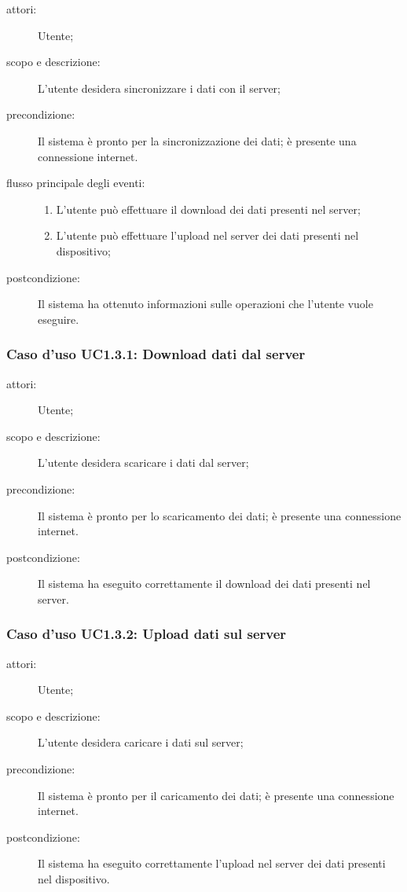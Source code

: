 \begin{description}
\item[attori:] Utente;
\item[scopo e descrizione:] L'utente desidera sincronizzare i dati con il server;
\item[precondizione:] Il sistema è pronto per la sincronizzazione dei dati; è presente una connessione internet.
\item[flusso principale degli eventi:] \hfill 
	\begin{enumerate}
	\item L'utente può effettuare il download dei dati presenti nel server;
	\item L'utente può effettuare l'upload nel server dei dati presenti nel dispositivo;
	\end{enumerate}
\item[postcondizione:] Il sistema ha ottenuto informazioni sulle operazioni che l'utente vuole eseguire.
\end{description}

\subsubsection{Caso d'uso UC1.3.1: Download dati dal server}
\begin{description}
\item[attori:] Utente;
\item[scopo e descrizione:] L'utente desidera scaricare i dati dal server;
\item[precondizione:] Il sistema è pronto per lo scaricamento dei dati; è presente una connessione internet.
\item[postcondizione:] Il sistema ha eseguito correttamente il download dei dati presenti nel server.
\end{description}

\subsubsection{Caso d'uso UC1.3.2: Upload dati sul server}
\begin{description}
\item[attori:] Utente;
\item[scopo e descrizione:] L'utente desidera caricare i dati sul server;
\item[precondizione:] Il sistema è pronto per il caricamento dei dati; è presente una connessione internet.
\item[postcondizione:] Il sistema ha eseguito correttamente l'upload nel server dei dati presenti nel dispositivo.
\end{description}

